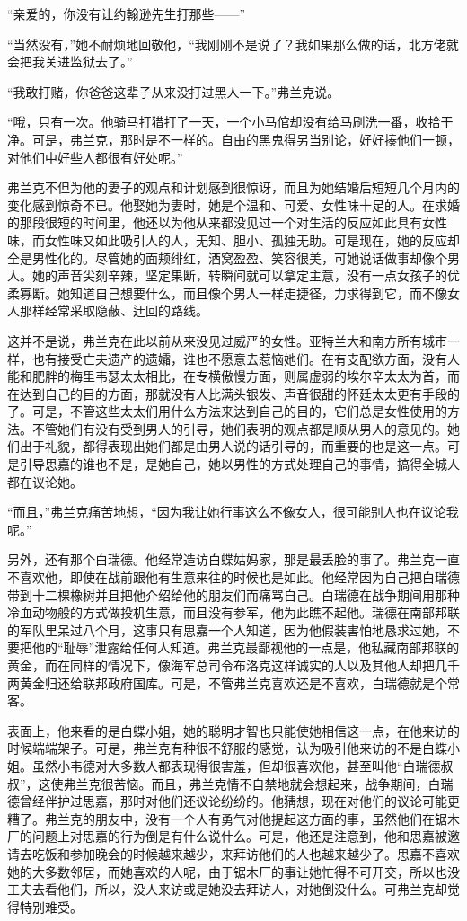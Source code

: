 \par “亲爱的，你没有让约翰逊先生打那些——”
\par “当然没有，”她不耐烦地回敬他，“我刚刚不是说了？我如果那么做的话，北方佬就会把我关进监狱去了。”
\par “我敢打赌，你爸爸这辈子从来没打过黑人一下。”弗兰克说。
\par “哦，只有一次。他骑马打猎打了一天，一个小马倌却没有给马刷洗一番，收拾干净。可是，弗兰克，那时是不一样的。自由的黑鬼得另当别论，好好揍他们一顿，对他们中好些人都很有好处呢。”
\par 弗兰克不但为他的妻子的观点和计划感到很惊讶，而且为她结婚后短短几个月内的变化感到惊奇不已。他娶她为妻时，她是个温和、可爱、女性味十足的人。在求婚的那段很短的时间里，他还以为他从来都没见过一个对生活的反应如此具有女性味，而女性味又如此吸引人的人，无知、胆小、孤独无助。可是现在，她的反应却全是男性化的。尽管她的面颊绯红，酒窝盈盈、笑容很美，可她说话做事却像个男人。她的声音尖刻辛辣，坚定果断，转瞬间就可以拿定主意，没有一点女孩子的优柔寡断。她知道自己想要什么，而且像个男人一样走捷径，力求得到它，而不像女人那样经常采取隐蔽、迂回的路线。
\par 这并不是说，弗兰克在此以前从来没见过威严的女性。亚特兰大和南方所有城市一样，也有接受亡夫遗产的遗孀，谁也不愿意去惹恼她们。在有支配欲方面，没有人能和肥胖的梅里韦瑟太太相比，在专横傲慢方面，则属虚弱的埃尔辛太太为首，而在达到自己的目的方面，那就没有人比满头银发、声音很甜的怀廷太太更有手段的了。可是，不管这些太太们用什么方法来达到自己的目的，它们总是女性使用的方法。不管她们有没有受到男人的引导，她们表明的观点都是顺从男人的意见的。她们出于礼貌，都得表现出她们都是由男人说的话引导的，而重要的也是这一点。可是引导思嘉的谁也不是，是她自己，她以男性的方式处理自己的事情，搞得全城人都在议论她。
\par “而且，”弗兰克痛苦地想，“因为我让她行事这么不像女人，很可能别人也在议论我呢。”
\par 另外，还有那个白瑞德。他经常造访白蝶姑妈家，那是最丢脸的事了。弗兰克一直不喜欢他，即使在战前跟他有生意来往的时候也是如此。他经常因为自己把白瑞德带到十二棵橡树并且把他介绍给他的朋友们而痛骂自己。白瑞德在战争期间用那种冷血动物般的方式做投机生意，而且没有参军，他为此瞧不起他。瑞德在南部邦联的军队里呆过八个月，这事只有思嘉一个人知道，因为他假装害怕地恳求过她，不要把他的“耻辱”泄露给任何人知道。弗兰克最鄙视他的一点是，他私藏南部邦联的黄金，而在同样的情况下，像海军总司令布洛克这样诚实的人以及其他人却把几千两黄金归还给联邦政府国库。可是，不管弗兰克喜欢还是不喜欢，白瑞德就是个常客。
\par 表面上，他来看的是白蝶小姐，她的聪明才智也只能使她相信这一点，在他来访的时候端端架子。可是，弗兰克有种很不舒服的感觉，认为吸引他来访的不是白蝶小姐。虽然小韦德对大多数人都表现得很害羞，但却很喜欢他，甚至叫他“白瑞德叔叔”，这使弗兰克很苦恼。而且，弗兰克情不自禁地就会想起来，战争期间，白瑞德曾经伴护过思嘉，那时对他们还议论纷纷的。他猜想，现在对他们的议论可能更糟了。弗兰克的朋友中，没有一个人有勇气对他提起这方面的事，虽然他们在锯木厂的问题上对思嘉的行为倒是有什么说什么。可是，他还是注意到，他和思嘉被邀请去吃饭和参加晚会的时候越来越少，来拜访他们的人也越来越少了。思嘉不喜欢她的大多数邻居，而她喜欢的人呢，由于锯木厂的事让她忙得不可开交，所以也没工夫去看他们，所以，没人来访或是她没去拜访人，对她倒没什么。可弗兰克却觉得特别难受。
